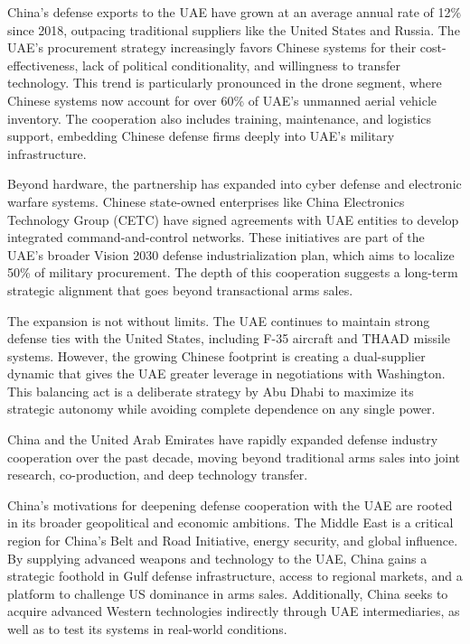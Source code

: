 \documentclass[10pt,a4paper]{article}
\begin{document}
{\small China's defense exports to the UAE have grown at an average annual rate of 12\% since 2018, outpacing traditional suppliers like the United States and Russia. The UAE's procurement strategy increasingly favors Chinese systems for their cost-effectiveness, lack of political conditionality, and willingness to transfer technology. This trend is particularly pronounced in the drone segment, where Chinese systems now account for over 60\% of UAE's unmanned aerial vehicle inventory. The cooperation also includes training, maintenance, and logistics support, embedding Chinese defense firms deeply into UAE's military infrastructure.}\par
{\small Beyond hardware, the partnership has expanded into cyber defense and electronic warfare systems. Chinese state-owned enterprises like China Electronics Technology Group (CETC) have signed agreements with UAE entities to develop integrated command-and-control networks. These initiatives are part of the UAE's broader Vision 2030 defense industrialization plan, which aims to localize 50\% of military procurement. The depth of this cooperation suggests a long-term strategic alignment that goes beyond transactional arms sales.}\par
{\small The expansion is not without limits. The UAE continues to maintain strong defense ties with the United States, including F-35 aircraft and THAAD missile systems. However, the growing Chinese footprint is creating a dual-supplier dynamic that gives the UAE greater leverage in negotiations with Washington. This balancing act is a deliberate strategy by Abu Dhabi to maximize its strategic autonomy while avoiding complete dependence on any single power.}\par
{\small China and the United Arab Emirates have rapidly expanded defense industry cooperation over the past decade, moving beyond traditional arms sales into joint research, co-production, and deep technology transfer.}\par
{}\par\vspace{1pt}
{\small China's motivations for deepening defense cooperation with the UAE are rooted in its broader geopolitical and economic ambitions. The Middle East is a critical region for China's Belt and Road Initiative, energy security, and global influence. By supplying advanced weapons and technology to the UAE, China gains a strategic foothold in Gulf defense infrastructure, access to regional markets, and a platform to challenge US dominance in arms sales. Additionally, China seeks to acquire advanced Western technologies indirectly through UAE intermediaries, as well as to test its systems in real-world conditions.}\par
\end{document}
